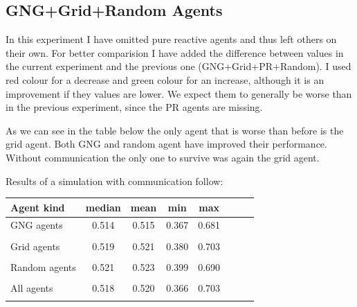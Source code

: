 \clearpage
                                
\subsection{GNG+Grid+Random Agents}

In this experiment I have omitted pure reactive agents and thus left others on their own. For better comparision I have added the difference between values in the current experiment and the previous one (GNG+Grid+PR+Random). I used red colour for a decrease and green colour for an increase, although it is an improvement if they values are lower. We expect them to generally be worse than in the previous experiment, since the PR agents are missing.

As we can see in the table below the only agent that is worse than before is the grid agent. Both GNG and random agent have improved their performance. Without communication the only one to survive was again the grid agent.    
            
Results of a simulation with communication follow:

\begin{center}
  \begin{tabular}{l*{6}{c}r}
  Agent kind        & median & mean & min & max \\
  \hline
  GNG agents        & 0.514                   & 0.515                   & 0.367                  & 0.681  \\
                    & \color{red}{-0.003}     & \color{red}{-0.005}     & \color{red}{-0.035}    & \color{red}{-0.024}      \\
  Grid agents       & 0.519                   & 0.521                   & 0.380                  & 0.703   \\   
                    & \color{green}{+0.002}   & \color{green}{+0.003}   & \color{green}{+0.004}  & \color{green}{+0.037} \\
  Random agents     & 0.521                   & 0.523                   & 0.399                  & 0.690   \\
                    & \color{red}{-0.001}     & \color{red}{-0.002}  	& \color{red}{-0.008}    & \color{red}{-0.007}  \\
  All agents        & 0.518                   & 0.520                   & 0.366                  & 0.703  \\
                    & \color{green}{+0.001}   & \color{green}{+0.001}   & \color{red}{-0.001}  &   \color{red}{-0.002}    \\
  \end{tabular}                                
\end{center}

